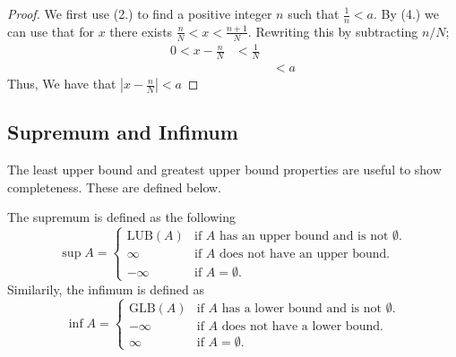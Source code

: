 \begin{enumerate}[label=\arabic{*}.]
    \begin{proof}
        We first use (2.) to find a positive integer $n$ such that $\frac{1}{n}< a$. By (4.) we can use that for $x$ there exists $\frac{n}{N} < x < \frac{n+1}{N}$. Rewriting this by subtracting $n/N$; 
        \begin{align*}0 < x - \frac{n}{N} &< \frac{1}{N} \\
        &\quad \quad \quad < a\end{align*}
        Thus, We have that $|x - \frac{n}{N}| < a$
    \end{proof}
\end{enumerate}

\subsection{Supremum and Infimum}
The least upper bound and greatest upper bound properties are useful to show completeness. These are defined below.
\begin{definition}
    The supremum is defined as the following 
    \begin{equation}
        \sup A = \begin{cases}
            \mathrm{LUB}(A) & \text{if $A$ has an upper bound and is not 
            $\emptyset$.} \\
            \infty & \text{if $A$ does not have an upper bound.}\\
            -\infty & \text{if $A = \emptyset$.}
        \end{cases}
    \end{equation}
    Similarily, the infimum is defined as 
    \begin{equation}
        \inf A = \begin{cases}
            \mathrm{GLB}(A) & \text{if $A$ has a lower bound and is not 
            $\emptyset$.} \\
            -\infty & \text{if $A$ does not have a lower bound.}\\
            \infty & \text{if $A = \emptyset$.}
        \end{cases}
    \end{equation}
\end{definition}


